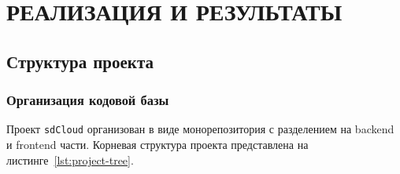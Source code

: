 
\chapter{РЕАЛИЗАЦИЯ И РЕЗУЛЬТАТЫ}

\section{Структура проекта}

\subsection{Организация кодовой базы}

Проект \texttt{sdCloud} организован в виде монорепозитория с разделением на backend и frontend части. Корневая структура проекта представлена на листинге~\ref{lst:project-tree}.

